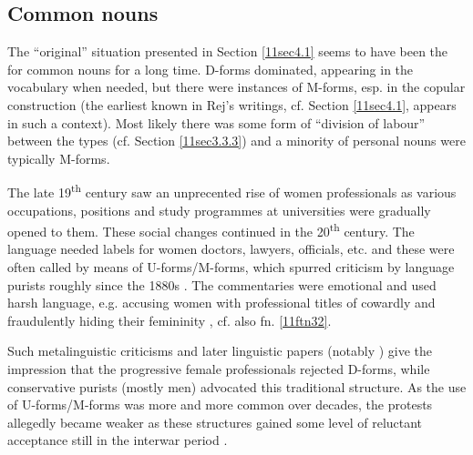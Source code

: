\documentclass[output=paper,colorlinks,citecolor=brown]{langscibook}
\begin{document}
\subsection{Common nouns} \label{11sec4.3}

The ``original'' situation presented in Section \ref{11sec4.1} seems to have been the  for common nouns for a long time. D-forms dominated, appearing in the vocabulary when needed, but there were instances of M-forms, esp. in the copular construction (the earliest known  in Rej's writings, cf. Section \ref{11sec4.1}, appears in such a context). Most likely there was some form of ``division of labour'' between the types (cf. Section \ref{11sec3.3.3}) and a minority of personal nouns were typically M-forms.

The late 19\textsuperscript{th} century saw an unprecented rise of women professionals as various occupations, positions and study programmes at universities were gradually opened to them. These social changes continued in the 20\textsuperscript{th} century. The language needed labels for women doctors, lawyers, officials, etc. and these were often called by means of U-forms/M-forms, which spurred criticism by language purists roughly since the 1880s \citep[28]{jezykpolski1933}. The commentaries were emotional and used harsh language, e.g. accusing women with professional titles of cowardly and fraudulently hiding their femininity \citep[118]{poradnikjezykowy1911}, cf. also fn. \ref{11ftn32}.

Such metalinguistic criticisms and later linguistic papers (notably \citealt{klemensiewicz1957}) give the impression that the progressive female professionals rejected D-forms, while conservative purists (mostly men) advocated this traditional structure. As the use of U-forms/M-forms was more and more common over decades, the protests allegedly became weaker as these structures gained some level of reluctant acceptance still in the interwar period \citep[112--113]{klemensiewicz1957}.
\end{document}
